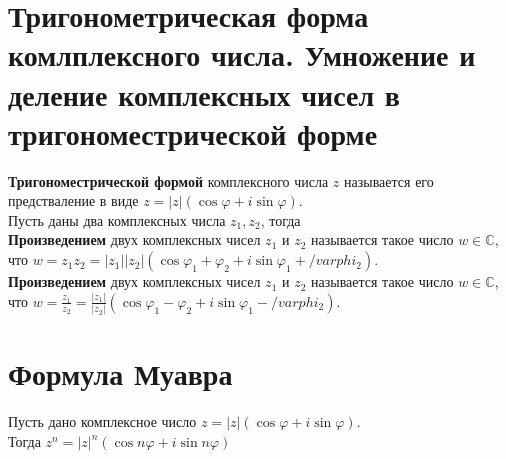 \documentclass[a4paper,11pt]{report}
\begin{document}
\section{Тригонометрическая форма комлплексного числа. Умножение и деление комплексных чисел в тригономестрической
	      форме}
\textbf{Тригономестрической формой} комплексного числа $z$ называется его предстваление в виде 
$z = |z|(\cos{\varphi} + i\sin{\varphi})$.\\
Пусть даны два комплексных числа $z_1, z_2$, тогда\\
\textbf{Произведением} двух комплексных чисел $z_1$ и $z_2$ называется такое число $w \in \mathbb{C}$, что
$w = z_1z_2 = |z_1||z_2|(\cos{\varphi_1 + \varphi_2} + i\sin{\varphi_1 + /varphi_2})$.\\
\textbf{Произведением} двух комплексных чисел $z_1$ и $z_2$ называется такое число $w \in \mathbb{C}$, что
$w = \frac{z_1}{z_2} = \frac{|z_1|}{|z_2|}(\cos{\varphi_1 - \varphi_2} + i\sin{\varphi_1 - /varphi_2})$.\\
\section{Формула Муавра}
Пусть дано комплексное число $z = |z|(\cos{\varphi} + i\sin{\varphi})$.\\
Тогда $z^n = |z|^n(\cos{n\varphi} + i\sin{n\varphi})$
\end{document}
